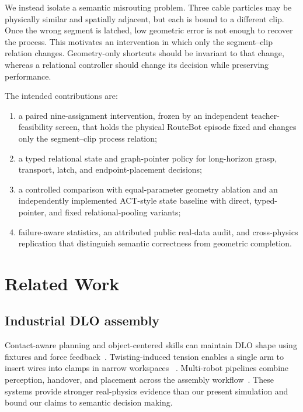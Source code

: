 \documentclass[journal]{IEEEtran}
\begin{document}
We instead isolate a semantic misrouting problem.  Three cable particles may
be physically similar and spatially adjacent, but each is bound to a different
clip.  Once the wrong segment is latched, low geometric error is not enough to
recover the process.  This motivates an intervention in which only the
segment--clip relation changes.  Geometry-only shortcuts should be invariant to
that change, whereas a relational controller should change its decision while
preserving performance.

The intended contributions are:

\begin{enumerate}
  \item a paired nine-assignment intervention, frozen by an independent
  teacher-feasibility screen, that holds the physical RouteBot episode fixed
  and changes only the segment--clip process relation;
  \item a typed relational state and graph-pointer policy for long-horizon
  grasp, transport, latch, and endpoint-placement decisions;
  \item a controlled comparison with equal-parameter geometry ablation and an
independently implemented ACT-style state baseline with direct, typed-pointer,
and fixed relational-pooling variants;
  \item failure-aware statistics, an attributed public real-data audit, and
  cross-physics replication that distinguish semantic correctness from
  geometric completion.
\end{enumerate}

\section{Related Work}

\subsection{Industrial DLO assembly}

Contact-aware planning and object-centered skills can maintain DLO shape using
fixtures and force feedback~\cite{chen2023contact}.  Twisting-induced tension
enables a single arm to insert wires into clamps in narrow workspaces
~\cite{zhang2024twisting}.  Multi-robot pipelines combine perception, handover,
and placement across the assembly workflow~\cite{chen2025multirobot}.  These
systems provide stronger real-physics evidence than our present simulation and
bound our claims to semantic decision making.
\end{document}
